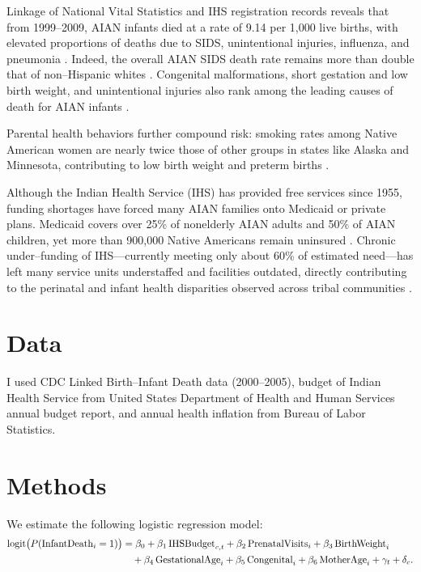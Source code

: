 \documentclass{article}
\DeclareMathOperator{\logit}{logit}   %
\begin{document}
Linkage of National Vital Statistics and IHS registration records reveals that from 1999--2009, AIAN infants died at a rate of 9.14 per 1,000 live births, with elevated proportions of deaths due to SIDS, unintentional injuries, influenza, and pneumonia \citep{wong_american_2014}. Indeed, the overall AIAN SIDS death rate remains more than double that of non--Hispanic whites \citep{macdorman_m_f_understanding_2011}. Congenital malformations, short gestation and low birth weight, and unintentional injuries also rank among the leading causes of death for AIAN infants \citep{wong_american_2014}.

Parental health behaviors further compound risk: smoking rates among Native American women are nearly twice those of other groups in states like Alaska and Minnesota, contributing to low birth weight and preterm births \citep{kaplan1997prevalence}. 

Although the Indian Health Service (IHS) has provided free services since 1955, funding shortages have forced many AIAN families onto Medicaid or private plans. Medicaid covers over 25\% of nonelderly AIAN adults and 50\% of AIAN children, yet more than 900,000 Native Americans remain uninsured \citep{samantha_artiga_medicaid_2017}. Chronic under--funding of IHS—currently meeting only about 60\% of estimated need—has left many service units understaffed and facilities outdated, directly contributing to the perinatal and infant health disparities observed across tribal communities \citep{ASPE2022,WarneFrizzell2014}.

\section{Data}
I used CDC Linked Birth--Infant Death data (2000--2005), budget of Indian Health Service from United States Department of Health and Human Services annual budget report, and annual health inflation from Bureau of Labor Statistics. 

\section{Methods}
We estimate the following logistic regression model:
\begin{align}
\logit\bigl(P(\mathrm{InfantDeath}_{i}=1)\bigr)
&= \beta_{0} + \beta_{1}\,\mathrm{IHSBudget}_{c,t} + \beta_{2}\,\mathrm{PrenatalVisits}_{i} + \beta_{3}\,\mathrm{BirthWeight}_{i}
\notag\\
&\quad + \beta_{4}\,\mathrm{GestationalAge}_{i} + \beta_{5}\,\mathrm{Congenital}_{i} + \beta_{6}\,\mathrm{MotherAge}_{i} + \gamma_{t} + \delta_{c}.
\label{eq:logit}
\end{align}
\end{document}
